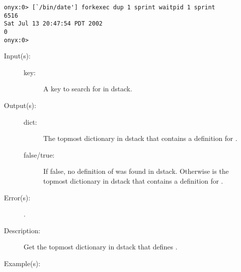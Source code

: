 \begin{description}
\begin{description}
\begin{verbatim}
onyx:0> [`/bin/date'] forkexec dup 1 sprint waitpid 1 sprint
6516
Sat Jul 13 20:47:54 PDT 2002
0
onyx:0>
		\end{verbatim}
	\end{description}
\label{systemdict:where}
\item[{\onyxop{key}{where}{false}}: ]
\item[{\onyxop{key}{where}{dict true}}: ]
	\begin{description}\item[]
	\item[Input(s): ]
		\begin{description}\item[]
		\item[key: ]
			A key to search for in dstack.
		\end{description}
	\item[Output(s): ]
		\begin{description}\item[]
		\item[dict: ]
			The topmost dictionary in dstack that contains a
			definition for .
		\item[false/true: ]
			If false, no definition of  was found in
			dstack.  Otherwise  is the topmost
			dictionary in dstack that contains a definition for
			.
		\end{description}
	\item[Error(s): ]
		\begin{description}\item[]
		\item[.]
		\end{description}
	\item[Description: ]
		Get the topmost dictionary in dstack that defines .
	\item[Example(s): ]\begin{verbatim}


\end{verbatim}
\end{description}
\end{description}
